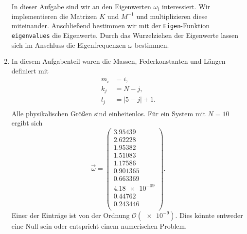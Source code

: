 \begin{enumerate}[label=\alph*)]
In dieser Aufgabe sind wir an den Eigenwerten $\omega_i$ interessiert. Wir implementieren die Matrizen $K$ und $M^{-1}$ und multiplizieren diese miteinander. Anschließend bestimmen wir mit der \texttt{Eigen}-Funktion \texttt{eigenvalues} die Eigenwerte. Durch das Wurzelziehen der Eigenwerte lassen sich im Anschluss die Eigenfrequenzen $\omega$ bestimmen.

\item In diesem Aufgabenteil waren die Massen, Federkonstanten und Längen definiert mit 
\begin{align*}
    m_i &= i,\\
    k_j &= N-j,\\
    l_j &= |5-j|+1.\\
\end{align*}
Alle physikalischen Größen sind einheitenlos. 
Für ein System mit $N=10$ ergibt sich 
\begin{equation*}
    \vec \omega = \begin{pmatrix*}
        3.95439 \\
        2.62228 \\
        1.95382 \\
        1.51083 \\
        1.17586 \\
       0.901365 \\
       0.663369 \\
       \num{4.18e-09} \\
        0.44762 \\
       0.243446 \\
    \end{pmatrix*}.
\end{equation*}
Einer der Einträge ist von der Ordnung $\mathcal{O}(\num{e-9})$. Dies könnte entweder eine Null sein oder entspricht einem numerischen Problem.
\end{enumerate}

